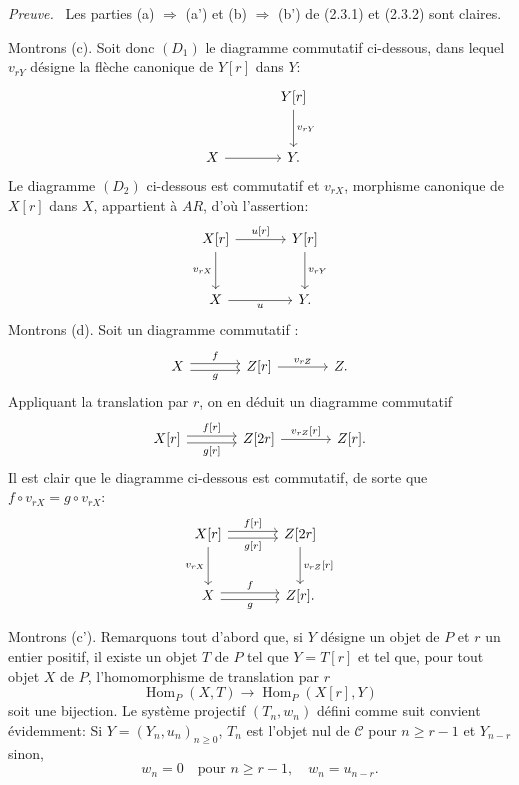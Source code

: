 \documentclass[11pt]{article}
\newenvironment{prooftext}[1][Proof]{\par\noindent\emph{#1.}\ }{\par\medskip}
\DeclareMathOperator{\Hom}{Hom}
\providecommand{\Hom}{\operatorname{Hom}}
\providecommand{\cC}{\mathcal C}
\providecommand{\cC}{\mathcal C}
\providecommand{\Hom}{\operatorname{Hom}}
\begin{document}
\begin{prooftext}[Preuve]
Les parties (a) $\Rightarrow$ (a') et (b) $\Rightarrow$ (b') de (2.3.1) et (2.3.2) sont claires.

Montrons (c). Soit donc $(D_1)$ le diagramme commutatif ci-dessous, dans lequel $v_{rY}$ désigne la flèche canonique de $Y[r]$ dans $Y$:
\[
\begin{tikzcd}[column sep=large,row sep=large]
& Y[r] \arrow[d,"{v_{rY}}"]\\
X \arrow[r] & Y .
\end{tikzcd}
\]
Le diagramme $(D_2)$ ci-dessous est commutatif et $v_{rX}$, morphisme canonique de $X[r]$ dans $X$, appartient à $AR$, d'où l'assertion:
\[
\begin{tikzcd}[column sep=large,row sep=large]
X[r] \arrow[r,"{u[r]}"] \arrow[d,"{v_{rX}}"'] & Y[r] \arrow[d,"{v_{rY}}"]\\
X \arrow[r,"u"'] & Y .
\end{tikzcd}
\]
Montrons (d). Soit un diagramme commutatif :
\[
\begin{tikzcd}[column sep=large]
X \arrow[r,shift left,"f"] \arrow[r,shift right,"g"'] & Z[r] \arrow[r,"{v_{rZ}}"] & Z .
\end{tikzcd}
\]
Appliquant la translation par $r$, on en déduit un diagramme commutatif
\[
\begin{tikzcd}[column sep=large]
X[r] \arrow[r,shift left,"{f[r]}"] \arrow[r,shift right,"{g[r]}"'] & Z[2r] \arrow[r,"{v_{rZ}[r]}"] & Z[r].
\end{tikzcd}
\]
Il est clair que le diagramme ci-dessous est commutatif, de sorte que $f\circ v_{rX}=g\circ v_{rX}$:
\[
\begin{tikzcd}[column sep=large,row sep=large]
X[r] \arrow[r,shift left,"{f[r]}"] \arrow[r,shift right,"{g[r]}"'] \arrow[d,"{v_{rX}}"'] & Z[2r] \arrow[d,"{v_{rZ}[r]}"]\\
X \arrow[r,shift left,"f"] \arrow[r,shift right,"g"'] & Z[r] .
\end{tikzcd}
\]

Montrons (c'). Remarquons tout d'abord que, si $Y$ désigne un objet de $P$ et $r$ un entier positif, il existe un objet $T$ de $P$ tel que $Y=T[r]$ et tel que, pour tout objet $X$ de $P$, l'homomorphisme de translation par $r$
\[
\Hom_P(X,T)\longrightarrow\Hom_P(X[r],Y)
\]
soit une bijection. Le système projectif $(T_n,w_n)$ défini comme suit convient évidemment:
Si $Y=(Y_n,u_n)_{n\ge 0}$, $T_n$ est l'objet nul de $\cC$ pour $n\ge r-1$ et $Y_{n-r}$ sinon,
\[
w_n=0\quad\text{pour } n\ge r-1,\quad w_n=u_{n-r}.
\]


\end{prooftext}
\end{document}
